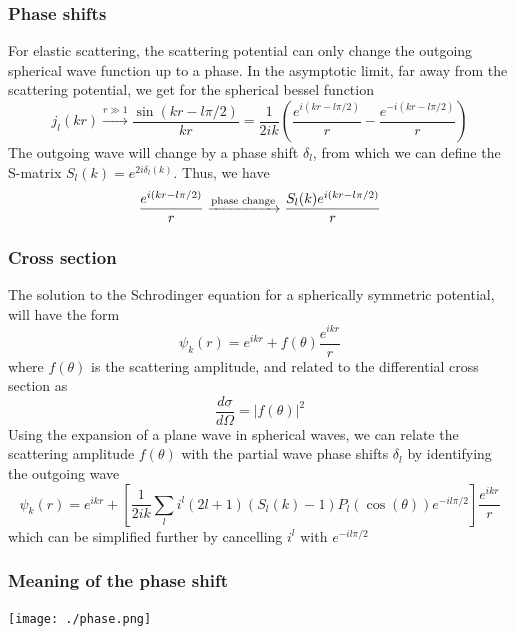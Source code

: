 \documentclass[compress]{beamer}
\begin{document}
\frame
{
\frametitle{Phase shifts}
\begin{small}
{\scriptsize

For elastic scattering, the scattering potential can only change the outgoing spherical wave function up to a phase. In the asymptotic limit, far away from the scattering potential, we get for the spherical bessel function
\[
j_l(kr) \xrightarrow[]{ r \gg 1} \frac{\sin(kr -l\pi/2)}{kr} =  \frac{1}{2ik}\left( \frac{e^{i(kr-l\pi/2)}}{r} - \frac{e^{-i(kr-l\pi/2)}}{r}\right)
\]
The outgoing wave will change by a phase shift $\delta_l$, from which we can define the S-matrix $S_l(k) = e^{2i\delta_l(k)}$. Thus, we have
\[
 \frac{e^{i(kr-l\pi/2)}}{r} \xrightarrow[]{\textnormal{phase change}}  \frac{S_l(k)e^{i(kr-l\pi/2)}}{r}
\]
}
\end{small}

}

\frame
{
\frametitle{Cross section}
\begin{small}
{\scriptsize

The solution to the Schrodinger equation for a spherically symmetric potential, will have the form
\[
\psi_k(r) = e^{ikr} + f(\theta)\frac{e^{ikr}}{r}
\]
where $f(\theta)$ is the scattering amplitude, and related to the differential cross section as
\[
\frac{d\sigma}{d\Omega} = |f(\theta)|^2
\]
Using the expansion of a plane wave in spherical waves, we can relate the scattering amplitude $f(\theta)$ with the partial wave phase shifts $\delta_l$ by identifying the outgoing wave 
\[
\psi_k(r) = e^{ikr} + \left[\frac{1}{2ik}\sum_l i^l (2l+1) (S_l(k)-1)P_l(\cos(\theta))e^{-il\pi/2}\right] \frac{e^{ikr}}{r}
\]
which can be simplified further by cancelling $i^l$ with $e^{-il\pi/2}$ 
}
\end{small}

}


\frame
{
\frametitle{Meaning of the phase shift}
\begin{center}
\texttt{[image: ./phase.png]}
\end{center}
}
\end{document}
